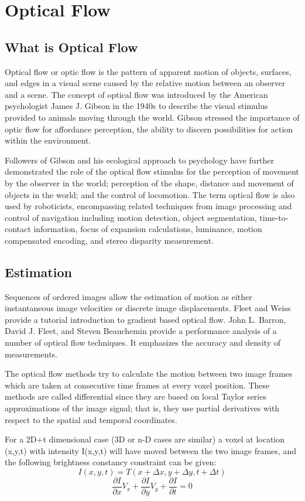 \section{Optical Flow}
\subsection{What is Optical Flow}
Optical flow or optic flow is the pattern of apparent motion of objects, surfaces,
and edges in a visual scene caused by the relative motion between an observer and a
scene. The concept of optical flow was introduced by the American psychologist James
J. Gibson in the 1940s to describe the visual stimulus provided to animals moving
through the world. Gibson stressed the importance of optic flow for affordance
perception, the ability to discern possibilities for action within the environment.\par
Followers of Gibson and his ecological approach to psychology have further demonstrated the role of the optical flow stimulus for the perception of movement by
the observer in the world; perception of the shape, distance and movement of objects in
the world; and the control of locomotion.
The term optical flow is also used by roboticists, encompassing related
techniques from image processing and control of navigation including motion detection,
object segmentation, time-to-contact information, focus of expansion calculations,
luminance, motion compensated encoding, and stereo disparity measurement.

\subsection{Estimation}
Sequences of ordered images allow the estimation of motion as either
instantaneous image velocities or discrete image displacements. Fleet and Weiss
provide a tutorial introduction to gradient based optical flow. John L. Barron, David J.
Fleet, and Steven Beauchemin provide a performance analysis of a number of optical
flow techniques. It emphasizes the accuracy and density of measurements.\par
The optical flow methods try to calculate the motion between two image frames
which are taken at consecutive time frames at every voxel position. These methods are
called differential since they are based on local Taylor series approximations of the
image signal; that is, they use partial derivatives with respect to the spatial and temporal
coordinates. \par
For a 2D+t dimensional case (3D or n-D cases are similar) a voxel at location (x,y,t)
with intensity I(x,y,t) will have moved between the two image frames, and the following
brightness constancy constraint can be given:
\begin{equation}
I(x,y,t) = T(x + \Delta x, y + \Delta y, t + \Delta t)
\end{equation}
\begin{equation}
\frac{\partial I}{\partial x}V_x + \frac{\partial I}{\partial y}V_y + \frac{\partial I}{\partial t} = 0
\end{equation}